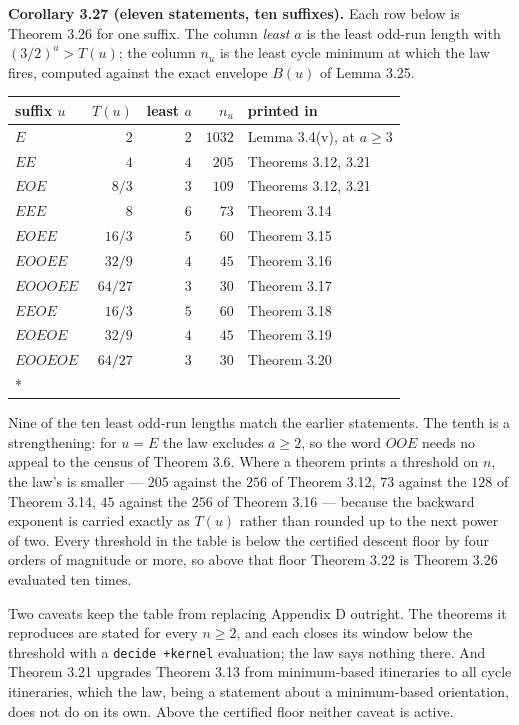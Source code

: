 \documentclass[12pt]{article}
\begin{document}
\textbf{Corollary 3.27 (eleven statements, ten suffixes).} Each row
below is Theorem 3.26 for one suffix. The column \emph{least \(a\)} is
the least odd-run length with \((3/2)^a>T(u)\); the column \(n_u\) is
the least cycle minimum at which the law fires, computed against the
exact envelope \(B(u)\) of Lemma 3.25.

\begingroup\small

\begin{longtable}[]{@{}lrrrl@{}}
\toprule\noalign{}
suffix \(u\) & \(T(u)\) & least \(a\) & \(n_u\) & printed in \\
\midrule\noalign{}
\endhead
\bottomrule\noalign{}
\endfoot
\bottomrule\noalign{}
\endlastfoot
\(E\) & \(2\) & \(2\) & \(1032\) & Lemma 3.4(v), at \(a\ge3\) \\
\(EE\) & \(4\) & \(4\) & \(205\) & Theorems 3.12, 3.21 \\
\(EOE\) & \(8/3\) & \(3\) & \(109\) & Theorems 3.12, 3.21 \\
\(EEE\) & \(8\) & \(6\) & \(73\) & Theorem 3.14 \\
\(EOEE\) & \(16/3\) & \(5\) & \(60\) & Theorem 3.15 \\
\(EOOEE\) & \(32/9\) & \(4\) & \(45\) & Theorem 3.16 \\
\(EOOOEE\) & \(64/27\) & \(3\) & \(30\) & Theorem 3.17 \\
\(EEOE\) & \(16/3\) & \(5\) & \(60\) & Theorem 3.18 \\
\(EOEOE\) & \(32/9\) & \(4\) & \(45\) & Theorem 3.19 \\
\(EOOEOE\) & \(64/27\) & \(3\) & \(30\) & Theorem 3.20 \\*
\end{longtable}

\endgroup

Nine of the ten least odd-run lengths match the earlier statements. The
tenth is a strengthening: for \(u=E\) the law excludes \(a\ge 2\), so
the word \(OOE\) needs no appeal to the census of Theorem 3.6. Where a
theorem prints a threshold on \(n\), the law's is smaller --- \(205\)
against the \(256\) of Theorem 3.12, \(73\) against the \(128\) of
Theorem 3.14, \(45\) against the \(256\) of Theorem 3.16 --- because the
backward exponent is carried exactly as \(T(u)\) rather than rounded up
to the next power of two. Every threshold in the table is below the
certified descent floor by four orders of magnitude or more, so above
that floor Theorem 3.22 is Theorem 3.26 evaluated ten times.

Two caveats keep the table from replacing Appendix D outright. The
theorems it reproduces are stated for every \(n\ge 2\), and each closes
its window below the threshold with a \texttt{decide\ +kernel}
evaluation; the law says nothing there. And Theorem 3.21 upgrades
Theorem 3.13 from minimum-based itineraries to all cycle itineraries,
which the law, being a statement about a minimum-based orientation, does
not do on its own. Above the certified floor neither caveat is active.
\end{document}
